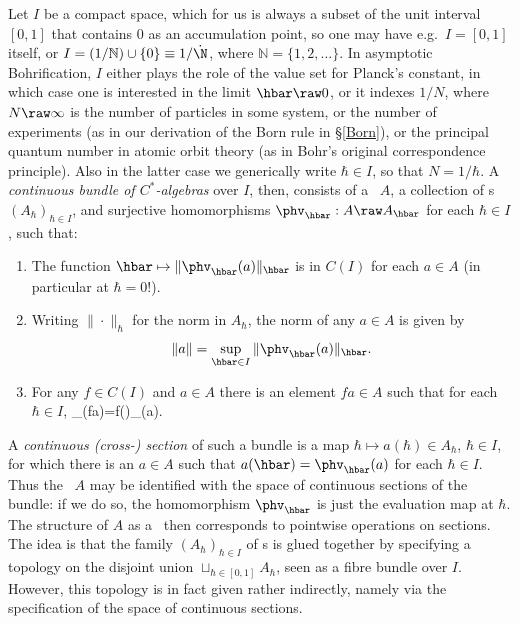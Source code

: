 \documentclass[12pt]{article}
\begin{document}
 Let $I$ be a compact space, which for us is always a
subset of the unit interval $[0,1]$ that  contains 0 as an accumulation point, so one may have e.g.\ $I=[0,1]$ itself, or $I=(1/\mathbb{N})\cup \{0\}\equiv1/\dot{\N}$, where $\mathbb{N}=\{1,2,\ldots\}$. In asymptotic Bohrification, $I$ either plays the role of the value set for Planck's constant, in which case one is interested in the limit $\hbar\raw 0$, 
or it indexes $1/N$, where $N\raw\infty$ is the number of particles in some system, or the number of experiments (as in our derivation of the Born rule in \S\ref{Born}), or the principal quantum number in atomic orbit theory (as in Bohr's original correspondence principle). Also in the latter case we generically write $\hbar\in I$, so that $N=1/\hbar$. 
A \emph{continuous bundle of $C^*$-algebras} over $I$, then,  consists of a
 \ca\ $A$, a collection of \ca s $(A_{\hbar})_{{\hbar}\in I}$, and surjective homomorphisms $\phv_{\hbar}:A\raw A_{\hbar}$ for each $\hbar\in I$ , such that:
\begin{enumerate}
\item
The function ${\hbar}\mapsto  \|\phv_{\hbar}(a)\|_{\hbar}$ is in $C(I)$ for each $a\in A$ (in particular at $\hbar=0$!).
\item
Writing  $\|\cdot\|_{\hbar}$ for the norm in $A_{\hbar}$, 
the norm of any $a\in A$ is given by
\begin{equation}
\| a\|=\sup_{{\hbar}\in I}\|\phv_{\hbar}(a)\|_{\hbar}.
\end{equation}
\item
For any $f\in C(I)$ and $a\in A$ there is an element $fa\in A$ such that for each ${\hbar}\in I$,  
\beq
\phv_{\hbar}(fa)=f({\hbar})\phv_{\hbar}(a).
\eeq
\end{enumerate}

 A  \emph{continuous (cross-) section} of such a bundle is a map $\hbar\mapsto a(\hbar)\in A_{\hbar}$, $\hbar\in I$,  for which there is an $a\in A$ such that $a(\hbar)=\phv_{\hbar}(a)$ for each ${\hbar}\in I$. 
Thus the \ca\ $A$ may  be identified with the space of continuous sections of the bundle: if we do so, the homomorphism $\phv_{\hbar}$ is just the evaluation map at $\hbar$.  The structure of $A$  as a \ca\ then corresponds to pointwise operations on sections. 
The idea is that the  family $(A_{\hbar})_{\hbar\in I}$ of \ca s is glued together by specifying a topology on the
disjoint union $\sqcup_{\hbar\in [0,1]}A_{\hbar}$, seen as a fibre
 bundle over $I$.
 However, this topology is in fact given rather indirectly, namely via the specification of the space of continuous sections.
\end{document}
